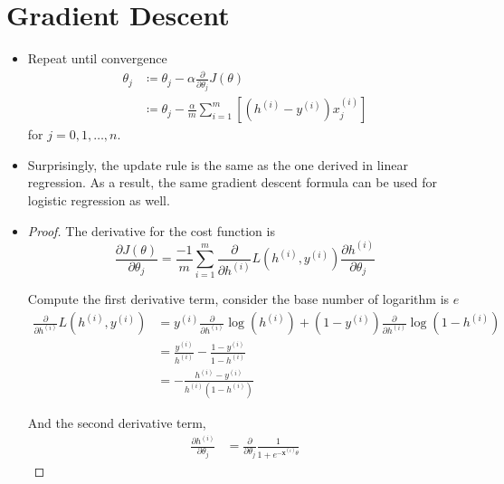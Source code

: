 \section{Gradient Descent}
\begin{itemize}
    \item Repeat until convergence
    \begin{equation}
        \begin{split}
            \theta_j &\coloneqq \theta_j - \alpha \frac{\partial}{\partial\theta_j}J\left(\theta\right)\\
            &\coloneqq \theta_j - \frac{\alpha}{m} \sum_{i=1}^{m}\left[\left(h^{(i)}-y^{(i)}\right)x^{(i)}_j\right]
        \end{split}
    \end{equation}
    for $j=0,1,\dots,n$. 
    \item Surprisingly, the update rule is the same as the one derived in linear regression. As a result, the same gradient descent formula can be used for logistic regression as well.
    
    \item
    \begin{proof}
        The derivative for the cost function is
        \begin{equation}
            \frac{\partial J(\theta)}{\partial\theta_j} = \frac{-1}{m} \sum_{i=1}^{m} \frac{\partial}{\partial h^{(i)}} L\left(h^{(i)},y^{(i)}\right) \frac{\partial h^{(i)}}{\partial \theta_j}
        \end{equation}
        
        Compute the first derivative term, consider the base number of logarithm is $e$
        \begin{equation}
            \begin{split}
                \frac{\partial}{\partial h^{(i)}} L\left(h^{(i)},y^{(i)}\right)  &= y^{(i)} \frac{\partial}{\partial h^{(i)}} \log\left(h^{(i)}\right) + \left(1-y^{(i)}\right) \frac{\partial}{\partial h^{(i)}} \log\left(1-h^{(i)}\right)\\
                &= \frac{y^{(i)}}{h^{(i)}} - \frac{1-y^{(i)}}{1-h^{(i)}}\\
                &= - \frac{h^{(i)}-y^{(i)}}{{h^{(i)}}\left(1-h^{(i)}\right)}
            \end{split}
        \end{equation}
        
        And the second derivative term,
        \begin{equation}
            \begin{split}
                \frac{\partial h^{(i)}}{\partial \theta_j} &= \frac{\partial}{\partial \theta_j} \frac{1}{1+e^{-\mathbf{x}^{(i)}\theta}}
            \end{split}
        \end{equation}
        

\end{proof}
\end{itemize}
